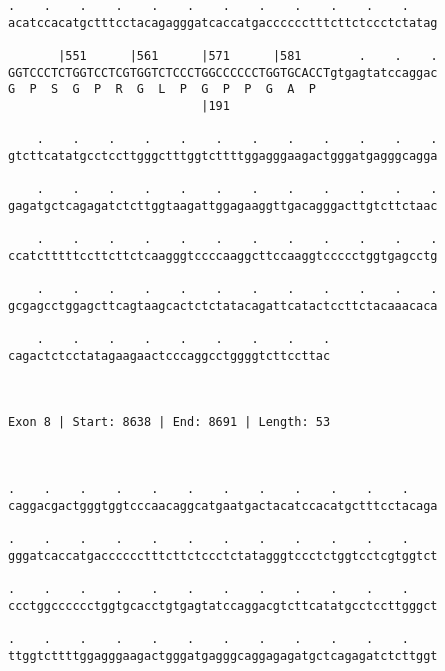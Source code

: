 \documentclass{article}
\begin{document}
\begin{Verbatim}
.    .    .    .    .    .    .    .    .    .    .    .    
acatccacatgctttcctacagagggatcaccatgacccccctttcttctccctctatag
                                                            
       |551      |561      |571      |581        .    .    .
GGTCCCTCTGGTCCTCGTGGTCTCCCTGGCCCCCCTGGTGCACCTgtgagtatccaggac
G  P  S  G  P  R  G  L  P  G  P  P  G  A  P                 
                           |191                             
  
    .    .    .    .    .    .    .    .    .    .    .    .
gtcttcatatgcctccttgggctttggtcttttggagggaagactgggatgagggcagga
                                                            
    .    .    .    .    .    .    .    .    .    .    .    .
gagatgctcagagatctcttggtaagattggagaaggttgacagggacttgtcttctaac
                                                            
    .    .    .    .    .    .    .    .    .    .    .    .
ccatctttttccttcttctcaagggtccccaaggcttccaaggtccccctggtgagcctg
                                                            
    .    .    .    .    .    .    .    .    .    .    .    .
gcgagcctggagcttcagtaagcactctctatacagattcatactccttctacaaacaca
                                                            
    .    .    .    .    .    .    .    .    .
cagactctcctatagaagaactcccaggcctggggtcttccttac
                                             
                                             
 
Exon 8 | Start: 8638 | End: 8691 | Length: 53



.    .    .    .    .    .    .    .    .    .    .    .    
caggacgactgggtggtcccaacaggcatgaatgactacatccacatgctttcctacaga
                                                            
.    .    .    .    .    .    .    .    .    .    .    .    
gggatcaccatgacccccctttcttctccctctatagggtccctctggtcctcgtggtct
                                                            
.    .    .    .    .    .    .    .    .    .    .    .    
ccctggcccccctggtgcacctgtgagtatccaggacgtcttcatatgcctccttgggct
                                                            
.    .    .    .    .    .    .    .    .    .    .    .    
ttggtcttttggagggaagactgggatgagggcaggagagatgctcagagatctcttggt
                                                            

\end{Verbatim}
\end{document}
